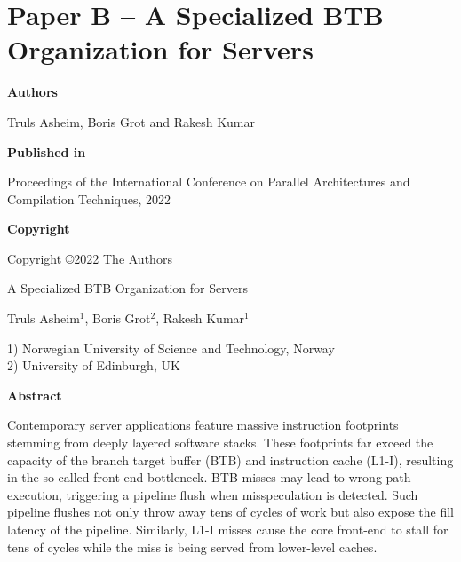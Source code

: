 \documentclass[../../../main.tex]{subfiles}
\begin{document}
\chapter{Paper B -- A Specialized BTB Organization for Servers}
\label{chap:pact-paper}

\noindent \textbf{Authors}

\vspace*{0.3cm}

\noindent Truls Asheim, Boris Grot and Rakesh Kumar

\vspace*{0.7cm}

\noindent \textbf{Published in}

\vspace*{0.3cm}

\noindent Proceedings of the International Conference on Parallel Architectures and Compilation Techniques, 2022

\vspace*{0.7cm}

\noindent \textbf{Copyright}

\vspace*{0.3cm}

\noindent Copyright ©2022 The Authors

\newpage

\vspace*{0.1cm}

\begin{center}

\Huge{A Specialized BTB Organization for Servers}

\vspace{0.6cm}

\large{Truls Asheim$^{1}$, Boris Grot$^{2}$, Rakesh Kumar$^{1}$}

\vspace{0.1cm}

\small{1) Norwegian University of Science and Technology, Norway}\\
\small{2) University of Edinburgh, UK}


\end{center}

\vspace{0.2cm}

\begin{center}
  \textbf{Abstract}
  \end{center}
\begin{changemargin}{0.75cm}{0.75cm}
Contemporary server applications feature massive instruction footprints stemming from deeply layered software stacks. These footprints far exceed the capacity of the branch target buffer (BTB) and instruction cache (L1-I), resulting in the so-called front-end bottleneck. BTB misses may lead to wrong-path execution, triggering a pipeline flush when misspeculation is detected. Such pipeline flushes not only throw away tens of cycles of work but also expose the fill latency of the pipeline. Similarly, L1-I misses cause the core front-end to stall for tens of cycles while the miss is being served from lower-level caches.
\end{changemargin}
\end{document}
